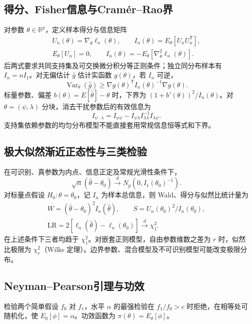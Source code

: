 \documentclass[../main.tex]{subfiles}
\begin{document}
\subsection{得分、Fisher信息与Cramér--Rao界}
对参数 $\theta\in\mathbb R^p$，定义样本得分与信息矩阵
\begin{gather*}
U_n(\theta)=\nabla_\theta\ell_n(\theta),\qquad
I_n(\theta)=E_\theta[U_nU_n^{\mathsf T}],\\
E_\theta[U_n]=0,\qquad I_n(\theta)=-E_\theta[\nabla_\theta^2\ell_n(\theta)].
\end{gather*}
后两式要求共同支持集及可交换微分积分等正则条件；独立同分布样本有 $I_n=nI_1$。对无偏估计 $\widehat g$ 估计实函数 $g(\theta)$，若 $I_n$ 可逆，
\[
\operatorname{Var}_\theta(\widehat g)\ge
\nabla g(\theta)^{\mathsf T}I_n(\theta)^{-1}\nabla g(\theta).
\]
标量参数、偏差 $b(\theta)=E[\widehat\theta]-\theta$ 时，下界为 $(1+b'(\theta))^2/I_n(\theta)$。对 $\theta=(\psi,\lambda)$ 分块，消去干扰参数后的有效信息为
\[
I_{\psi\cdot\lambda}=I_{\psi\psi}-I_{\psi\lambda}I_{\lambda\lambda}^{-1}I_{\lambda\psi}.
\]
支持集依赖参数的均匀分布模型不能直接套用常规信息恒等式和下界。

\subsection{极大似然渐近正态性与三类检验}
在可识别、真参数为内点、信息正定及常规光滑性条件下，
\[
\sqrt n(\widehat\theta-\theta_0)\xrightarrow d N_p(0,I_1(\theta_0)^{-1}).
\]
对标量点假设 $H_0:\theta=\theta_0$，记 $I_n$ 为样本总信息，则 Wald、得分与似然比统计量为
\begin{gather*}
W=(\widehat\theta-\theta_0)^2 I_n(\widehat\theta),\qquad
S=U_n(\theta_0)^2/I_n(\theta_0),\\
\mathrm{LR}=2[\ell_n(\widehat\theta)-\ell_n(\theta_0)]
\xrightarrow d\chi_1^2.
\end{gather*}
在上述条件下三者均趋于 $\chi_1^2$。对嵌套正则模型，自由参数维数之差为 $r$ 时，似然比极限为 $\chi_r^2$（Wilks 定理）。边界参数、混合模型及不可识别模型可能改变极限分布。

\subsection{Neyman--Pearson引理与功效}
检验两个简单假设 $f_0$ 对 $f_1$，水平 $\alpha$ 的最强检验在 $f_1/f_0>c$ 时拒绝，在相等处可随机化，使 $E_0[\phi]=\alpha$。功效函数为 $\pi(\theta)=E_\theta[\phi]$。
\end{document}

